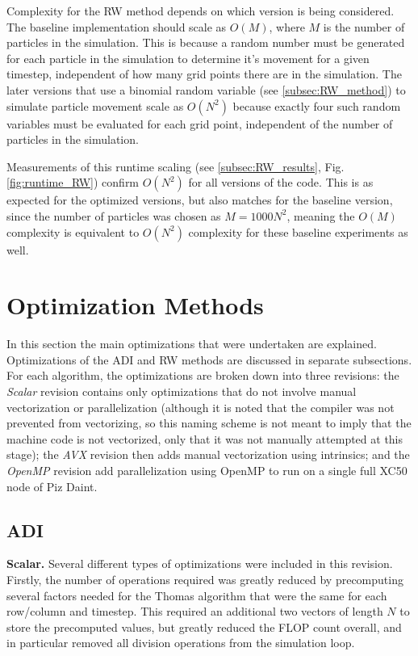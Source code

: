 \documentclass[letterpaper]{article}
\newcommand{\mypar}[1]{{\bf #1.}}
\begin{document}
Complexity for the RW method depends on which version is being considered. The baseline implementation should scale as $O(M)$, where $M$ is the number of particles in the simulation. This is because a random number must be generated for each particle in the simulation to determine it's movement for a given timestep, independent of how many grid points there are in the simulation. The later versions
that use a binomial random variable (see \ref{subsec:RW_method}) to simulate particle movement scale as $O(N^2)$ because exactly four such random variables must be evaluated for each grid point, independent of the number of particles in the simulation.

Measurements of this runtime scaling (see \ref{subsec:RW_results}, Fig. \ref{fig:runtime_RW}) confirm $O(N^2)$ for all versions of the code. This is as expected for the optimized versions, but also matches for the baseline version, since the number of particles was chosen as $M=1000N^2$, meaning the $O(M)$ complexity is equivalent to $O(N^2)$ complexity for these baseline experiments as well.


\section{Optimization Methods}\label{sec:method}

In this section the main optimizations that were undertaken are explained. Optimizations of the ADI and RW methods are discussed in separate subsections. For each algorithm, the optimizations are broken down into three revisions: the \textit{Scalar} revision contains only optimizations that do not involve manual vectorization or parallelization (although it is noted that the compiler was not prevented from vectorizing, so this naming scheme is not meant to imply that the machine code is not vectorized, only that it was not manually attempted at this stage); the \textit{AVX} revision then adds manual vectorization using intrinsics; and the \textit{OpenMP} revision add parallelization using OpenMP to run on a single full XC50 node of Piz Daint.

\subsection{ADI}\label{subsec:ADI_method}

\mypar{Scalar}
Several different types of optimizations were included in this revision. Firstly, the number of operations required was greatly reduced by precomputing several factors needed for the Thomas algorithm that were the same for each row/column and timestep. This required an additional two vectors of length $N$ to store the precomputed values, but greatly reduced the FLOP count overall, and in particular removed all division operations from the simulation loop.
\end{document}
